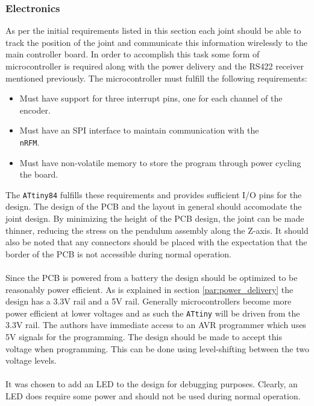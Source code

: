 \subsubsection{Electronics} %
\label{ssub:electronics}
As per the initial requirements listed in this section each joint should be able to track the position of the joint and communicate this information wirelessly to the main controller board.
In order to accomplish this task some form of microcontroller is required along with the power delivery and the RS422 receiver mentioned previously.
The microcontroller must fulfill the following requirements:
\begin{itemize}
 	\item Must have support for three interrupt pins, one for each channel of the encoder.
 	\item Must have an SPI interface to maintain communication with the\\ \texttt{nRFM}.
 	\item Must have non-volatile memory to store the program through power cycling the board.
\end{itemize}
The \texttt{ATtiny84} \cite{attiny84} fulfills these requirements and provides sufficient I/O pins for the design.
The design of the PCB and the layout in general should accomodate the joint design.
By minimizing the height of the PCB design, the joint can be made thinner, reducing the stress on the pendulum assembly along the Z-axis.
It should also be noted that any connectors should be placed with the expectation that the border of the PCB is not accessible during normal operation.
\\~\\
Since the PCB is powered from a battery the design should be optimized to be reasonably power efficient.
As is explained in section \ref{par:power_delivery} the design has a 3.3V rail and a 5V rail.
Generally microcontrollers become more power efficient at lower voltages and as such the \texttt{ATtiny} will be driven from the 3.3V rail.
The authors have immediate access to an AVR programmer which uses 5V signals for the programming.
The design should be made to accept this voltage when programming.
This can be done using level-shifting between the two voltage levels.
\\~\\
It was chosen to add an LED to the design for debugging purposes.
Clearly, an LED does require some power and should not be used during normal operation.
